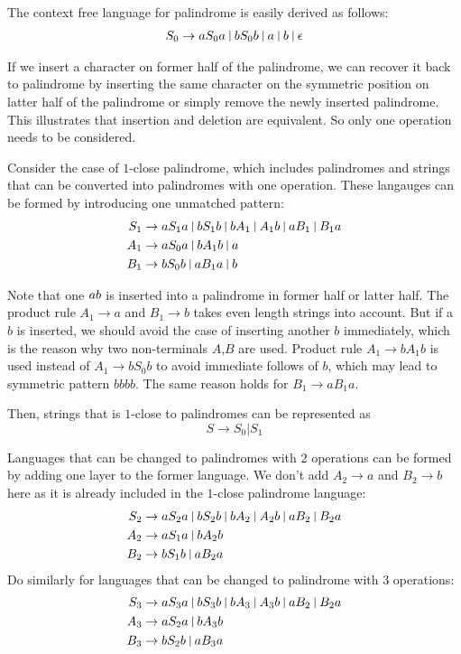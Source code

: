 \documentclass[12pt,a4paper]{article}
\newcommand{\question}[1]{\bigskip\noindent{\textbf{Q{#1} solution}}}
\begin{document}
\question{12.A}

The context free language for palindrome is easily derived as follows:
\begin{align}
  S_0 \rightarrow aS_0a\ \vline\ bS_0b\ \vline\ a\ \vline\ b\ \vline\ \epsilon
\end{align}

If we insert a character on former half of the palindrome, we can recover it back to palindrome by inserting the same character on the symmetric position on latter half of the palindrome or simply remove the newly inserted palindrome. This illustrates that insertion and deletion are equivalent. So only one operation needs to be considered.

Consider the case of $1$-close palindrome, which includes palindromes and strings that can be converted into palindromes with one operation. These langauges can be formed by introducing one unmatched pattern:
\begin{align}
  S_1 & \rightarrow aS_1a\ \vline\ bS_1b\ \vline\ bA_1\ \vline\ A_1b\  \vline\ aB_1\ \vline\ B_1a \\
  A_1 &\rightarrow aS_0a\ \vline\ bA_1b\ \vline\ a \\
  B_1 &\rightarrow bS_0b\ \vline\ aB_1a\ \vline\ b
\end{align}

Note that one $a\/b$ is inserted into a palindrome in former half or latter half. The product rule $A_1 \rightarrow a$ and $B_1 \rightarrow b$ takes even length strings into account. But if a $b$ is inserted, we should avoid the case of inserting another $b$ immediately, which is the reason why two non-terminals $A$,$B$ are used. Product rule $A_1 \rightarrow bA_1b$ is used instead of $A_1 \rightarrow bS_0b$ to avoid immediate follows of $b$, which may lead to symmetric pattern $bbbb$. The same reason holds for $B_1 \rightarrow aB_1a$.

Then, strings that is $1$-close to palindromes can be represented as  
$$
  S \rightarrow S_0 | S_1
$$

Languages that can be changed to palindromes with 2 operations can be formed by adding one layer to the former language. We don't add $A_2\rightarrow a$ and $B_2\rightarrow b$ here as it is already included in the $1$-close palindrome language:
\begin{align}
  S_2 & \rightarrow aS_2a\ \vline\ bS_2b\ \vline\ bA_2\ \vline\ A_2b\  \vline\ aB_2\ \vline\ B_2a \\
  A_2 &\rightarrow aS_1a\ \vline\ bA_2b \\
  B_2 &\rightarrow bS_1b\ \vline\ aB_2a
\end{align}
Do similarly for languages that can be changed to palindrome with 3 operations:
\begin{align}
  S_3 & \rightarrow aS_3a\ \vline\ bS_3b\ \vline\ bA_3\ \vline\ A_3b\  \vline\ aB_2\ \vline\ B_2a \\
  A_3 &\rightarrow aS_2a\ \vline\ bA_3b \\
  B_3 &\rightarrow bS_2b\ \vline\ aB_3a
\end{align}
\end{document}
